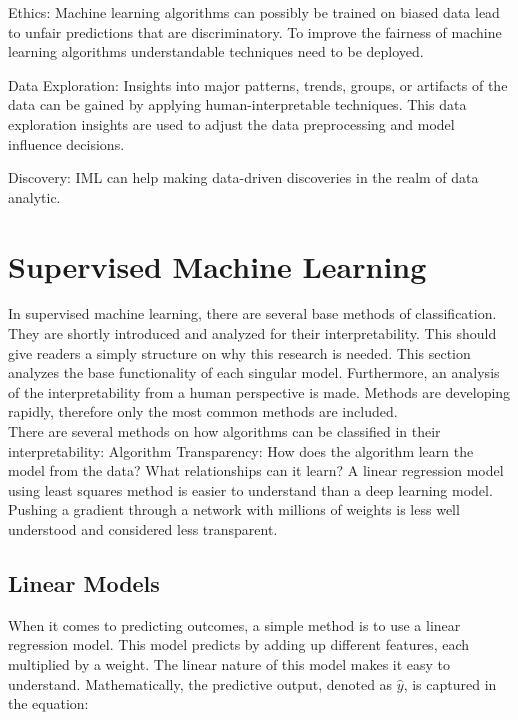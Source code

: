 Ethics: Machine learning algorithms can possibly be trained on biased data lead to unfair predictions that are discriminatory. To improve the fairness of machine learning algorithms understandable techniques need to be deployed. \cite{guidotti2018survey}

Data Exploration: Insights into major patterns, trends, groups, or artifacts of the data can be gained by applying human-interpretable techniques. This data exploration insights are used to adjust the data preprocessing and model influence decisions. \cite{murdoch2019definitions} \cite{berkhin2006} \cite{tukey1981}

Discovery: IML can help making data-driven discoveries in the realm of data analytic.





\section{Supervised Machine Learning}

In supervised machine learning, there are several base methods of classification. They are shortly introduced and analyzed for their interpretability. This should give readers a simply structure on why this research is needed. This section analyzes the base functionality of each singular model. Furthermore, an analysis of the interpretability from a human perspective is made. Methods are developing rapidly, therefore only the most common methods are included.
\\
There are several methods on how algorithms can be classified in their interpretability: Algorithm Transparency: How does the algorithm learn the model from the data? What relationships can it learn? \cite{molnar2022} A linear regression model using least squares method is easier to understand than a deep learning model. Pushing a gradient through a network with millions of weights is less well understood and considered less transparent.

\subsection{Linear Models}
When it comes to predicting outcomes, a simple method is to use a linear regression model. This model predicts by adding up different features, each multiplied by a weight. The linear nature of this model makes it easy to understand. Mathematically, the predictive output, denoted as $\hat{y}$, is  captured in the equation:

